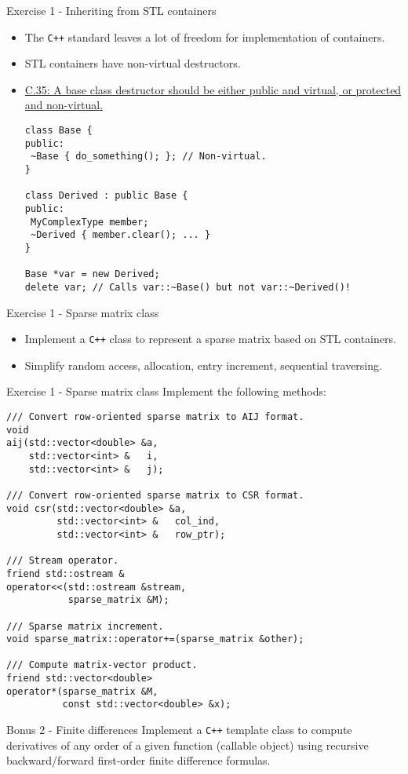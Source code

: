 \documentclass[10pt]{beamer}
\begin{document}
\begin{frame}[fragile]{Exercise 1 - Inheriting from STL containers}
\begin{itemize}
\item The \texttt{C++} standard leaves a lot of freedom for implementation of containers.
\item STL containers have non-virtual destructors.
\item \href{http://isocpp.github.io/CppCoreGuidelines/CppCoreGuidelines\#Rc-dtor-virtual}{C.35: A base class destructor should be either public and virtual, or protected and non-virtual.}
\small\begin{lstlisting}
class Base {
public:
 ~Base { do_something(); }; // Non-virtual.
}

class Derived : public Base {
public:
 MyComplexType member;
 ~Derived { member.clear(); ... }
}

Base *var = new Derived;
delete var; // Calls var::~Base() but not var::~Derived()!
\end{lstlisting}\normalsize
\end{itemize}
\end{frame}


\begin{frame}[fragile]{Exercise 1 - Sparse matrix class}
\begin{itemize}
\item Implement a \texttt{C++} class to represent a sparse matrix based on STL containers.
\item Simplify random access, allocation, entry increment, sequential traversing.
\end{itemize}
\end{frame}


\begin{frame}[fragile]{Exercise 1 - Sparse matrix class}
Implement the following methods:
\begin{lstlisting}[basicstyle=\footnotesize]
/// Convert row-oriented sparse matrix to AIJ format.
void
aij(std::vector<double> &a,
    std::vector<int> &   i,
    std::vector<int> &   j);

/// Convert row-oriented sparse matrix to CSR format.
void csr(std::vector<double> &a,
         std::vector<int> &   col_ind,
         std::vector<int> &   row_ptr);

/// Stream operator.
friend std::ostream &
operator<<(std::ostream &stream,
           sparse_matrix &M);

/// Sparse matrix increment.
void sparse_matrix::operator+=(sparse_matrix &other);

/// Compute matrix-vector product.
friend std::vector<double>
operator*(sparse_matrix &M,
          const std::vector<double> &x);
\end{lstlisting}
\end{frame}

\begin{frame}[fragile]{Bonus 2 - Finite differences}
Implement a \texttt{C++} template class to compute derivatives of any order of a given function (callable object) using recursive backward/forward first-order finite difference formulas.
\end{frame}
\end{document}
